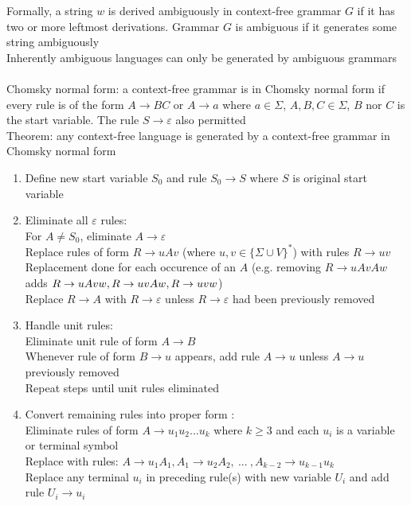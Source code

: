 \documentclass{article}
\newcommand*{\<}{\langle}
\renewcommand*{\>}{\rangle}
\begin{document}
			Formally, a string $w$ is derived ambiguously in context-free grammar $G$ if it has two or more leftmost derivations. Grammar $G$ is ambiguous if it generates some string ambiguously \\
			Inherently ambiguous languages can only be generated by ambiguous grammars \\
			\\
			Chomsky normal form: a context-free grammar is in Chomsky normal form if every rule is of the form $A \to BC$ or $A \to a$ where $a \in \Sigma$, $A, B, C \in \Sigma$, $B$ nor $C$ is the start variable. The rule $S \to \varepsilon$ also permitted \\
			Theorem: any context-free language is generated by a context-free grammar in Chomsky normal form 
			\begin{enumerate}
				\item Define new start variable $S_0$ and rule $S_0 \to S$ where $S$ is original start variable
				\item Eliminate all $\varepsilon$ rules: \\
				For $A \neq S_0$, eliminate $A \to \varepsilon$ \\
				Replace rules of form $R \to uAv$ (where $u, v \in \{\Sigma \cup V\}^*$) with rules $R \to uv$ \\
				Replacement done for each occurence of an $A$ (e.g. removing $R \to uAvAw$ adds $R \to uAvw, \\
				R \to uvAw, R \to uvw$) \\
				Replace $R \to A$ with $R \to \varepsilon$ unless $R \to \varepsilon$ had been previously removed
				\item Handle unit rules: \\
				Eliminate unit rule of form $A \to B$ \\
				Whenever rule of form $B \to u$ appears, add rule $A \to u$ unless $A \to u$ previously removed \\
				Repeat steps until unit rules eliminated
				\item Convert remaining rules into proper form : \\
				Eliminate rules of form $A \to u_1u_2...u_k$ where $k \geq 3$ and each $u_i$ is a variable or terminal symbol \\
				Replace with rules: $A \to u_1A_1, A_1 \to u_2A_2,\:...\:, A_{k - 2} \to u_{k - 1}u_k$ \\
				Replace any terminal $u_i$ in preceding rule(s) with new variable $U_i$ and add rule $U_i \to u_i$
				\end{enumerate}
\end{document}
